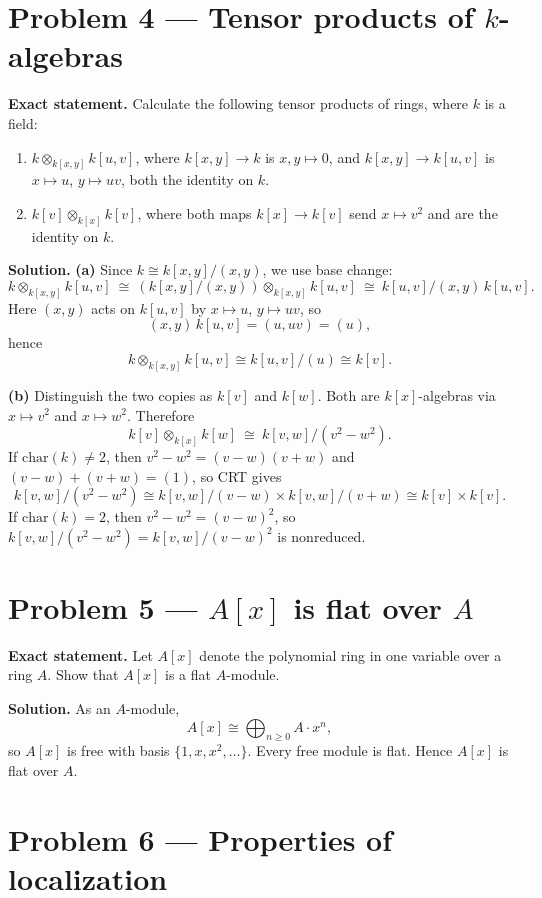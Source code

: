 \documentclass[12pt,a4paper]{article}
\theoremstyle{plain}
\theoremstyle{definition}      %
\begin{document}
	\section*{Problem 4 — Tensor products of \(k\)-algebras}
	
	\textbf{Exact statement.}
	Calculate the following tensor products of rings, where \(k\) is a field:
	\begin{enumerate}
		\item[(a)] \(k \otimes_{k[x,y]} k[u,v]\), where \(k[x,y]\to k\) is \(x,y\mapsto 0\),
		and \(k[x,y]\to k[u,v]\) is \(x\mapsto u\), \(y\mapsto uv\), both the identity on \(k\).
		\item[(b)] \(k[v]\otimes_{k[x]} k[v]\), where both maps \(k[x]\to k[v]\) send \(x\mapsto v^2\)
		and are the identity on \(k\).
	\end{enumerate}
	
	\textbf{Solution.}
	\textbf{(a)} Since \(k\cong k[x,y]/(x,y)\), we use base change:
	\[
	k\otimes_{k[x,y]} k[u,v]\ \cong\ (k[x,y]/(x,y))\otimes_{k[x,y]} k[u,v]
	\ \cong\ k[u,v]/(x,y)\,k[u,v].
	\]
	Here \((x,y)\) acts on \(k[u,v]\) by \(x\mapsto u\), \(y\mapsto uv\), so
	\[
	(x,y)\,k[u,v]=(u,uv)=(u),
	\]
	hence
	\[
	k\otimes_{k[x,y]} k[u,v]\cong k[u,v]/(u)\cong k[v].
	\]
	
	\medskip
	\textbf{(b)} Distinguish the two copies as \(k[v]\) and \(k[w]\). Both are \(k[x]\)-algebras via
	\(x\mapsto v^2\) and \(x\mapsto w^2\). Therefore
	\[
	k[v]\otimes_{k[x]} k[w]\ \cong\ k[v,w]/(v^2-w^2).
	\]
	If \(\mathrm{char}(k)\neq 2\), then \(v^2-w^2=(v-w)(v+w)\) and \((v-w)+(v+w)=(1)\), so CRT gives
	\[
	k[v,w]/(v^2-w^2)\cong k[v,w]/(v-w)\times k[v,w]/(v+w)\cong k[v]\times k[v].
	\]
	If \(\mathrm{char}(k)=2\), then \(v^2-w^2=(v-w)^2\), so \(k[v,w]/(v^2-w^2)=k[v,w]/(v-w)^2\) is nonreduced.
	
	\section*{Problem 5 — \(A[x]\) is flat over \(A\)}
	
	\textbf{Exact statement.}
	Let \(A[x]\) denote the polynomial ring in one variable over a ring \(A\). Show that \(A[x]\) is a flat \(A\)-module.
	
	\textbf{Solution.}
	As an \(A\)-module,
	\[
	A[x]\cong \bigoplus_{n\ge 0} A\cdot x^n,
	\]
	so \(A[x]\) is free with basis \(\{1,x,x^2,\dots\}\). Every free module is flat. Hence \(A[x]\) is flat over \(A\).
	
	\section*{Problem 6 — Properties of localization}
	
\end{document}
